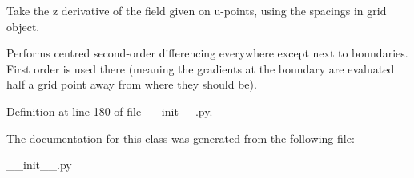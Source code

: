 Take the z derivative of the field given on u-\/points, using the spacings in grid object. 

Performs centred second-\/order differencing everywhere except next to boundaries. First order is used there (meaning the gradients at the boundary are evaluated half a grid point away from where they should be). 

Definition at line 180 of file \+\_\+\+\_\+init\+\_\+\+\_\+.\+py.



The documentation for this class was generated from the following file\+:\begin{DoxyCompactItemize}
\item 
\+\_\+\+\_\+init\+\_\+\+\_\+.\+py\end{DoxyCompactItemize}
